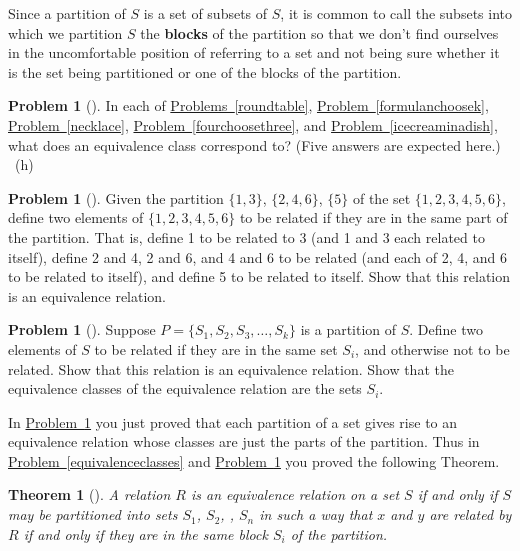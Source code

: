 \documentclass[10pt,]{book}
\newcommand{\terminology}[1]{\textbf{#1}}
\theoremstyle{plain}
\newtheorem{theorem}{Theorem}[section]
\theoremstyle{definition}
\newtheorem{activity}[project]{Problem}
\theoremstyle{definition}
\numberwithin{equation}{chapter}
\begin{document}
\hypertarget{p-1953}{}%
Since a partition of \(S\) is a set of subsets of \(S\), it is common to call the subsets into which we partition \(S\) the \terminology{blocks} of the partition so that we don't find ourselves in the uncomfortable position of referring to a set and not being sure whether it is the set being partitioned or one of the blocks of the partition.%
\begin{activity}[]\marginsymbol[-1em]{} \label{partitiontoequivalence}
\hypertarget{p-1954}{}%
In each of \hyperref[roundtable]{Problems~\ref{roundtable}}, \hyperref[formulanchoosek]{Problem~\ref{formulanchoosek}}, \hyperref[necklace]{Problem~\ref{necklace}}, \hyperref[fourchoosethree]{Problem~\ref{fourchoosethree}}, and \hyperref[icecreaminadish]{Problem~\ref{icecreaminadish}}, what does an equivalence class correspond to? (Five answers are expected here.)%
~{\tiny (h)}\end{activity}
\begin{activity}[]\marginsymbol[-1em]{} \label{activity-354}
\hypertarget{p-1957}{}%
Given the partition \(\{1,3\}\), \(\{2,4,6\}\), \(\{5\}\) of the set \(\{1,2,3,4,5,6\}\), define two elements of \(\{1,2,3,4,5,6\}\) to be related if they are in the same part of the partition. That is, define 1 to be related to 3 (and 1 and 3 each related to itself), define 2 and 4, 2 and 6, and 4 and 6 to be related (and each of 2, 4, and 6 to be related to itself), and define 5 to be related to itself. Show that this relation is an equivalence relation.%
\end{activity}
\begin{activity}[]\marginsymbol[-1em]{} \label{activity-355}
\hypertarget{p-1959}{}%
Suppose \(P = \{S_1, S_2, S_3, \ldots, S_k\}\) is a partition of \(S\). Define two elements of \(S\) to be related if they are in the same set \(S_i\), and otherwise not to be related. Show that this relation is an equivalence relation. Show that the equivalence classes of the equivalence relation are the sets \(S_i\).%
\end{activity}
\hypertarget{p-1961}{}%
In \hyperref[partitiontoequivalence]{Problem~\ref{partitiontoequivalence}} you just proved that each partition of a set gives rise to an equivalence relation whose classes are just the parts of the partition. Thus in \hyperref[equivalenceclasses]{Problem~\ref{equivalenceclasses}} and \hyperref[partitiontoequivalence]{Problem~\ref{partitiontoequivalence}} you proved the following Theorem.%
\begin{theorem}[{}]\label{theorem-11}
\hypertarget{p-1962}{}%
A relation \(R\) is an equivalence relation on a set \(S\) if and only if \(S\) may be partitioned into sets \(S_1\), \(S_2\), \textellipsis{}, \(S_n\) in such a way that \(x\) and \(y\) are related by \(R\) if and only if they are in the same block \(S_i\) of the partition. %
\end{theorem}
\end{document}
